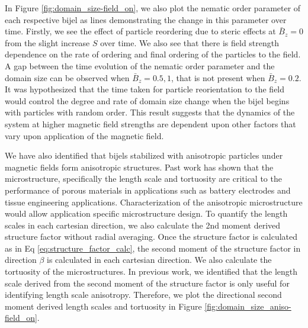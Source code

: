 In Figure \ref{fig:domain_size-field_on}, we also plot the nematic order parameter of each respective bijel as 
lines demonstrating the change in this parameter over time. Firstly, we see the effect of particle reordering due 
to steric effects at $\bar{B}_z = 0$ from the slight increase $S$ over time. We also see that there is field 
strength dependence on the rate of ordering and final ordering of the particles to the field. A gap between the 
time evolution of the nematic order parameter and the domain size can be observed when $\bar{B}_z = 0.5, 1$, 
that is not present when $\bar{B}_z = 0.2$. It was hypothesized that the time taken for particle reorientation 
to the field would control the degree and rate of domain size change when the bijel begins with particles with 
random order. This result suggests that the dynamics of the system at higher magnetic field strengths are 
dependent upon other factors that vary upon application of the magnetic field.

We have also identified that bijels stabilized with anisotropic particles under magnetic fields form anisotropic 
structures. Past work has shown that the microstructure, specifically the length scale and tortuosity are critical to 
the performance of porous materials in applications such as battery electrodes and tissue engineering applications. 
\cite{zhang_promoting_2019, ebner_tortuosity_2014, hsieh_architected_2021} Characterization of the anisotropic 
microstructure would allow application specific microstructure design. To quantify the length scales in each cartesian 
direction, we also calculate the 2nd moment derived structure factor without radial averaging. \cite{jansen_bijels_2011} 
Once the structure factor is calculated as in Eq \ref{eq:structure_factor_calc}, the second moment of the structure factor 
in direction $\beta$ is calculated in each cartesian direction. We also calculate the tortuosity of the microstructures. In 
previous work, we identified that the length scale derived from the second moment of the structure factor is only useful 
for identifying length scale anisotropy. Therefore, we plot the directional second moment derived length scales and 
tortuosity in Figure \ref{fig:domain_size_aniso-field_on}.

